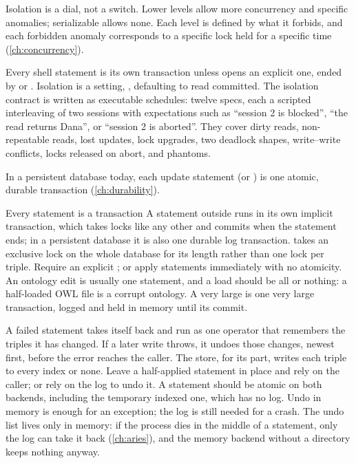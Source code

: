 \begin{keyidea}
Isolation is a dial, not a switch. Lower levels allow more concurrency and
specific anomalies; serializable allows none. Each level is defined by what it
forbids, and each forbidden anomaly corresponds to a specific lock held for a
specific time (\cref{ch:concurrency}).
\end{keyidea}

\begin{ontodb}[: transactions]
Every shell statement is its own transaction unless 
opens an explicit one, ended by  or
. Isolation is a setting,
, defaulting to read committed.
The isolation contract is written as executable schedules: twelve specs, each a
scripted interleaving of two sessions with expectations such as ``session 2 is
blocked'', ``the read returns Dana'', or ``session 2 is aborted''. They cover
dirty reads, non-repeatable reads, lost updates, lock upgrades, two deadlock
shapes, write--write conflicts, locks released on abort, and phantoms.

In a persistent database today, each update statement (or ) is one atomic, durable transaction (\cref{ch:durability}).
\end{ontodb}

\begin{decision}{Every statement is a transaction}
 A statement outside  runs in its own
implicit transaction, which takes locks like any other and commits when the
statement ends; in a persistent database it is also one durable log
transaction.  takes an exclusive lock on the whole
database for its length rather than one lock per triple.
 Require an explicit ; or apply statements
immediately with no atomicity.
 An ontology edit is usually one statement, and a load should be all
or nothing: a half-loaded OWL file is a corrupt ontology.
 A very large  is one very large
transaction, logged and held in memory until its commit.
\end{decision}

\begin{decision}{A failed statement takes itself back}
  and  run as one operator
that remembers the triples it has changed. If a later write throws, it undoes
those changes, newest first, before the error reaches the caller. The store,
for its part, writes each triple to every index or none.
 Leave a half-applied statement in place and rely on the
caller; or rely on the log to undo it.
 A statement should be atomic on both backends, including the
temporary indexed one, which has no log. Undo in memory is enough for an
exception; the log is still needed for a crash.
 The undo list lives only in memory: if the process dies in the
middle of a statement, only the log can take it back (\cref{ch:aries}), and the
memory backend without a directory keeps nothing anyway.
\end{decision}

